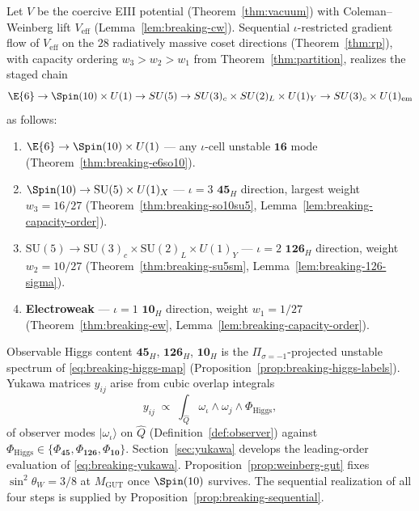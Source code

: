 \begin{theorem}\label{thm:breaking-complete}
Let $V$ be the coercive EIII potential (Theorem~\ref{thm:vacuum}) with
Coleman--Weinberg lift $V_{\mathrm{eff}}$ (Lemma~\ref{lem:breaking-cw}).
Sequential $\iota$-restricted gradient flow of $V_{\mathrm{eff}}$ on the $28$
radiatively massive coset directions (Theorem~\ref{thm:rp}), with capacity
ordering $w_3>w_2>w_1$ from Theorem~\ref{thm:partition}, realizes the staged
chain
\begin{equation}\label{eq:breaking-chain}
  \E{6}\to\Spin(10)\times U(1)\to SU(5)\to SU(3)_c\times SU(2)_L\times U(1)_Y
  \to SU(3)_c\times U(1)_{\mathrm{em}}
\end{equation}
as follows:
\begin{enumerate}[label=\textbf{(\arabic*)},leftmargin=*]
  \item \textbf{$\E{6}\to\Spin(10)\times U(1)$} --- any $\iota$-cell unstable
    $\mathbf{16}$ mode (Theorem~\ref{thm:breaking-e6so10}).
  \item \textbf{$\Spin(10)\to\mathrm{SU}(5)\times U(1)_X$} --- $\iota=3$
    $\mathbf{45}_H$ direction, largest weight $w_3=16/27$
    (Theorem~\ref{thm:breaking-so10su5},
    Lemma~\ref{lem:breaking-capacity-order}).
  \item \textbf{$\mathrm{SU}(5)\to\mathrm{SU}(3)_c\times\mathrm{SU}(2)_L
    \times U(1)_Y$} --- $\iota=2$ $\mathbf{126}_H$ direction, weight
    $w_2=10/27$ (Theorem~\ref{thm:breaking-su5sm},
    Lemma~\ref{lem:breaking-126-sigma}).
  \item \textbf{Electroweak} --- $\iota=1$ $\mathbf{10}_H$ direction, weight
    $w_1=1/27$ (Theorem~\ref{thm:breaking-ew},
    Lemma~\ref{lem:breaking-capacity-order}).
\end{enumerate}
Observable Higgs content $\mathbf{45}_H$, $\mathbf{126}_H$, $\mathbf{10}_H$ is
the $\Pi_{\sigma=-1}$-projected unstable spectrum of
\eqref{eq:breaking-higgs-map} (Proposition~\ref{prop:breaking-higgs-labels}).
Yukawa matrices $y_{ij}$ arise from cubic overlap integrals
\begin{equation}\label{eq:breaking-yukawa}
  y_{ij}\;\propto\;\int_{\hat Q}\omega_\iota\wedge\omega_j\wedge\Phi_{\mathrm{Higgs}},
\end{equation}
of observer modes $|\omega_\iota\rangle$ on $\hat Q$
(Definition~\ref{def:observer}) against $\Phi_{\mathrm{Higgs}}\in\{\Phi_{\mathbf{45}},
\Phi_{\mathbf{126}},\Phi_{\mathbf{10}}\}$. Section~\ref{sec:yukawa} develops
the leading-order evaluation of \eqref{eq:breaking-yukawa}.
Proposition~\ref{prop:weinberg-gut} fixes $\sin^2\theta_W=3/8$ at
$M_{\mathrm{GUT}}$ once $\Spin(10)$ survives. The sequential realization of all
four steps is supplied by Proposition~\ref{prop:breaking-sequential}.
\end{theorem}

